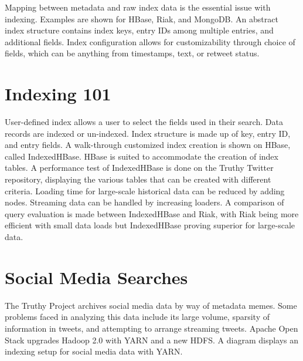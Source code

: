 Mapping between metadata and raw index data is the essential issue with
indexing. Examples are shown for HBase, Riak, and MongoDB. An abstract
index structure contains index keys, entry IDs among multiple entries,
and additional fields. Index configuration allows for customizability
through choice of fields, which can be anything from timestamps, text,
or retweet status.




\section{Indexing 101}

User-defined index allows a user to select the fields used in their
search. Data records are indexed or un-indexed. Index structure is made
up of key, entry ID, and entry fields. A walk-through customized index
creation is shown on HBase, called IndexedHBase. HBase is suited to
accommodate the creation of index tables. A performance test of
IndexedHBase is done on the Truthy Twitter repository, displaying the
various tables that can be created with different criteria. Loading time
for large-scale historical data can be reduced by adding nodes.
Streaming data can be handled by increasing loaders. A comparison of
query evaluation is made between IndexedHBase and Riak, with Riak being
more efficient with small data loads but IndexedHBase proving superior
for large-scale data.




\section{Social Media Searches}

The Truthy Project archives social media data by way of metadata memes.
Some problems faced in analyzing this data include its large volume,
sparsity of information in tweets, and attempting to arrange streaming
tweets. Apache Open Stack upgrades Hadoop 2.0 with YARN and a new HDFS.
A diagram displays an indexing setup for social media data with YARN.

